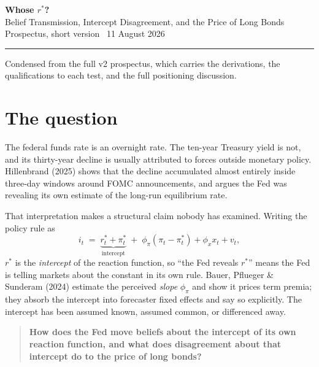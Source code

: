 \documentclass[11pt]{article}
\newcommand{\rs}{$r^{*}$}
\begin{document}
\begin{center}
{\large\textbf{Whose \boldmath$r^{*}$?}}\\[0.3em]
{\normalsize Belief Transmission, Intercept Disagreement, and the Price of Long Bonds}\\[0.5em]
{\small Prospectus, short version \textperiodcentered\ 11 August 2026}
\end{center}
\vspace{0.1em}
\noindent\rule{\textwidth}{0.4pt}
\suppressfloats[t]

\vspace{0.2em}
{\footnotesize\noindent Condensed from the full v2 prospectus, which carries the derivations,
the qualifications to each test, and the full positioning discussion.}

\section{The question}

The federal funds rate is an overnight rate. The ten-year Treasury yield is not, and its
thirty-year decline is usually attributed to forces outside monetary policy. Hillenbrand
(2025) shows that the decline accumulated almost entirely inside three-day windows around FOMC
announcements, and argues the Fed was revealing its own estimate of the long-run equilibrium
rate.

That interpretation makes a structural claim nobody has examined. Writing the policy rule as
\begin{equation}
i_t \;=\; \underbrace{r^{*}_t + \pi^{*}_t}_{\text{intercept}} \;+\; \phi_\pi\!\left(\pi_t - \pi^{*}_t\right) + \phi_x x_t + v_t ,
\label{eq:rule}
\end{equation}
\rs{} is the \emph{intercept} of the reaction function, so ``the Fed reveals \rs{}'' means the
Fed is telling markets about the constant in its own rule. Bauer, Pflueger \& Sunderam (2024)
estimate the perceived \emph{slope} $\phi_\pi$ and show it prices term premia; they absorb the
intercept into forecaster fixed effects and say so explicitly. The intercept has been assumed
known, assumed common, or differenced away.

\begin{quote}
\textbf{How does the Fed move beliefs about the intercept of its own reaction function, and
what does disagreement about that intercept do to the price of long bonds?}
\end{quote}
\end{document}
